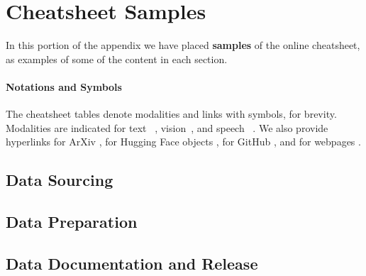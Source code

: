 \section{Cheatsheet Samples}

In this portion of the appendix we have placed \textbf{samples} of the online cheatsheet, as examples of some of the content in each section.

\paragraph{Notations and Symbols}
The cheatsheet tables denote modalities and links with symbols, for brevity.
Modalities are indicated for text ~\TextCircle[0.75]{}, vision~\VisionCircle[0.75]{}, and speech ~\SpeechCircle[0.75].
We also provide hyperlinks for ArXiv \earxiv[1.2em][-0.4ex]\hspace{0.25em}, for Hugging Face objects \ehf[1.2em][-0.4ex]\hspace{0.25em}, for GitHub \egithub[1.2em][-0.4ex]\hspace{0.25em}, and for webpages \eweb[1.2em][-0.4ex]\hspace{0.25em}.


\tocless\subsection{Data Sourcing}










\tocless\subsection{Data Preparation}











\tocless\subsection{Data Documentation and Release}

